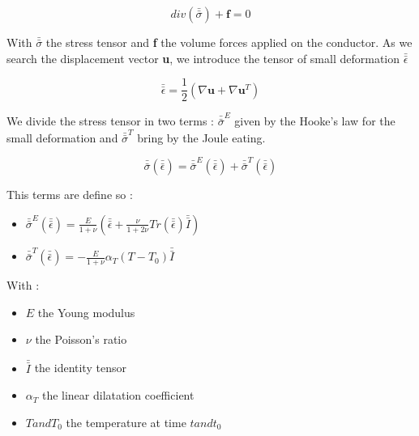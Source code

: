 \documentclass[11pt]{amsart}
\begin{document}
\[
div(\bar{\bar{\sigma}})+\textbf{f}=0
\]



With $\bar{\bar{\sigma}}$ the stress tensor and \textbf{f} the volume forces applied on the conductor.
As we search the displacement vector \textbf{u}, we introduce the tensor of small deformation $\bar{\bar{\epsilon}}$



\[
\bar{\bar{\epsilon}}=\frac{1}{2}(\nabla\textbf{u}+\nabla\textbf{u}^{T})
\]



We divide the stress tensor in two terms : $\bar{\bar{\sigma}}^{E}$ given by the Hooke’s law for the small deformation
and $\bar{\bar{\sigma}}^{T}$ bring by the Joule eating.



\[
\bar{\bar{\sigma}}(\bar{\bar{\epsilon}})=\bar{\bar{\sigma}}^{E} (\bar{\bar{\epsilon}})+\bar{\bar{\sigma}}^{T}(\bar{\bar{\epsilon}})
\]



This terms are define so :


\begin{itemize}

\item $\bar{\bar{\sigma}}^{E}(\bar{\bar{\epsilon}})=\frac{E}{1+\nu}(\bar{\bar{\epsilon}}+\frac{\nu}{1+2\nu}Tr(\bar{\bar{\epsilon}})\bar{\bar{I}})$

\item $\bar{\bar{\sigma}}^{T}(\bar{\bar{\epsilon}})=-\frac{E}{1+\nu}\alpha_{T}(T-T_{0})\bar{\bar{I}}$

\end{itemize}


With :


\begin{itemize}

\item $E$ the Young modulus

\item $\nu$ the Poisson’s ratio

\item $\bar{\bar{I}}$ the identity tensor

\item $\alpha_{T}$ the linear dilatation coefficient

\item $T and T_{0}$ the temperature at time $t and t_{0}$

\end{itemize}
\end{document}

